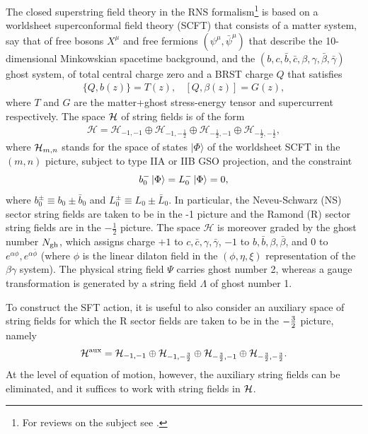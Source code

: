 \documentclass[12pt]{article}
\def\ie{\begin{equation}\begin{aligned}}
\def\fe{\end{aligned}\end{equation}}
\numberwithin{equation}{section}
\newcommand{\A}{{\alpha}}
\begin{document}
The closed superstring field theory in the RNS formalism\footnote{For reviews on the subject see \cite{Sen:2024nfd, deLacroix:2017lif, Maccaferri:2023vns, Erbin:2021smf, Erler:2019loq, Erler:2019vhl}.} is based on a worldsheet superconformal field theory (SCFT) that consists of a matter system, say that of free bosons $X^\mu$ and free fermions $(\psi^\mu, \bar\psi^\mu)$ that describe the 10-dimensional Minkowskian spacetime background, and the $(b,c,\bar b, \bar c, \beta,\gamma, \bar \beta, \bar \gamma)$ ghost system, of total central charge zero and a BRST charge $Q$ that satisfies
\ie
\{ Q, b(z)\} = T(z),~~~~ [Q, \beta(z)] = G(z),
\fe
where $T$ and $G$ are the matter+ghost stress-energy tensor and supercurrent respectively. The space ${\cal H}$ of string fields is of the form
\ie
\mathcal{H} = \mathcal{H}_{-1, -1} \oplus \mathcal{H}_{-1, -\frac{1}{2}} \oplus \mathcal{H}_{-\frac{1}{2}, -1} \oplus \mathcal{H}_{-\frac{1}{2}, -\frac{1}{2}},
\fe
where ${\cal H}_{m,n}$ stands for the space of states $|\Phi\rangle$ of the worldsheet SCFT in the $(m,n)$ picture, subject to type IIA or IIB GSO projection, and the constraint
\ie
b_0^- \ket{\Phi} = L_0^- \ket{\Phi} = 0,
\fe
where $b_0^\pm \equiv b_0 \pm \bar{b}_0$ and $L_0^\pm \equiv L_0 \pm \bar{L}_0$. In particular, the Neveu-Schwarz (NS) sector string fields are taken to be in the -1 picture and the Ramond (R) sector string fields are in the $-\frac{1}{2}$ picture.
The space $\mathcal{H}$ is moreover graded by the ghost number $N_{\rm gh}$, which assigns charge $+1$ to $c, \bar c, \gamma, \bar\gamma$, $-1$ to $b, \bar b, \beta, \bar\beta$, and 0 to $e^{\A\phi}, e^{\A\bar\phi}$ (where $\phi$ is the linear dilaton field in the $(\phi, \eta, \xi)$ representation of the $\beta\gamma$ system). The physical string field $\Psi$ carries ghost number 2, whereas a gauge transformation is generated by a string field $\Lambda$ of ghost number 1.


To construct the SFT action, it is useful to also consider an auxiliary space of string fields for which the R sector fields are taken to be in the $-{3\over 2}$ picture, namely
\ie
\mathcal{H}^{\rm aux} = \mathcal{H}_{-1, -1} \oplus \mathcal{H}_{-1, -\frac{3}{2}} \oplus \mathcal{H}_{-\frac{3}{2}, -1} \oplus \mathcal{H}_{-\frac{3}{2}, -\frac{3}{2}}.
\fe
At the level of equation of motion, however, the auxiliary string fields can be eliminated, and it suffices to work with string fields in ${\cal H}$.

\end{document}
